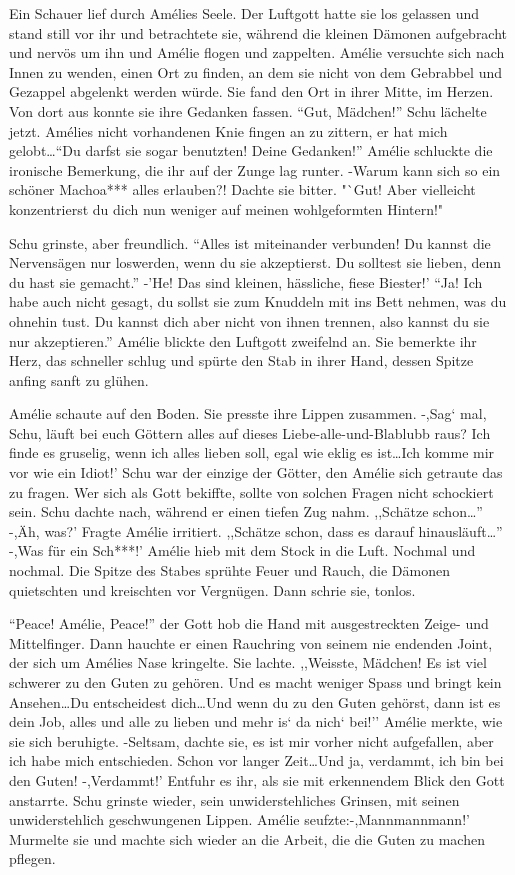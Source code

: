 \documentclass[11pt,titlepage,a5paper]{book}
\begin{document}
Ein Schauer lief durch Amélies Seele. Der Luftgott hatte sie los gelassen und stand still vor ihr und betrachtete sie, während die kleinen Dämonen aufgebracht und nervös um ihn und Amélie flogen und zappelten. Amélie versuchte sich nach Innen zu wenden, einen Ort zu finden, an dem sie nicht von dem Gebrabbel und Gezappel abgelenkt werden würde. Sie fand den Ort in ihrer Mitte, im Herzen. Von dort aus konnte sie ihre Gedanken fassen. "`Gut, Mädchen!"' Schu lächelte jetzt. Amélies nicht vorhandenen Knie fingen an zu zittern, er hat mich gelobt\dots "`Du darfst sie sogar benutzten! Deine Gedanken!"' Amélie schluckte die ironische Bemerkung, die ihr auf der Zunge lag runter. -Warum kann sich so ein schöner Machoa*** alles erlauben?! Dachte sie bitter. "`Gut! Aber vielleicht konzentrierst du dich nun weniger auf meinen wohlgeformten Hintern!" 

Schu grinste, aber freundlich. "`Alles ist miteinander verbunden! Du kannst die Nervensägen nur loswerden, wenn du sie akzeptierst. Du solltest sie lieben, denn du hast sie gemacht."' -'He! Das sind kleinen, hässliche, fiese Biester!' "`Ja! Ich habe auch nicht gesagt, du sollst sie zum Knuddeln mit ins Bett nehmen, was du ohnehin tust. Du kannst dich aber nicht von ihnen trennen, also kannst du sie nur akzeptieren."' Amélie blickte den Luftgott zweifelnd an. Sie bemerkte ihr Herz, das schneller schlug und spürte den Stab in ihrer Hand, dessen Spitze anfing sanft zu glühen.

Amélie schaute auf den Boden. Sie presste ihre Lippen zusammen. -,Sag` mal, Schu, läuft bei euch Göttern alles auf dieses Liebe-alle-und-Blablubb raus? Ich finde es gruselig, wenn ich alles lieben soll, egal wie eklig es ist\dots Ich komme mir vor wie ein Idiot!' Schu war der einzige der Götter, den Amélie sich getraute das zu fragen. Wer sich als Gott bekiffte, sollte von solchen Fragen nicht schockiert sein. Schu dachte nach, während er einen tiefen Zug nahm. ,,Schätze schon\dots'' -,Äh, was?' Fragte Amélie irritiert. ,,Schätze schon, dass es darauf hinausläuft\dots'' -,Was für ein Sch***!' Amélie hieb mit dem Stock in die Luft. Nochmal und nochmal. Die Spitze des Stabes sprühte Feuer und Rauch, die Dämonen quietschten und kreischten vor Vergnügen. Dann schrie sie, tonlos.

"`Peace! Amélie, Peace!"' der Gott hob die Hand mit ausgestreckten Zeige- und Mittelfinger. Dann hauchte er einen Rauchring von seinem nie endenden Joint, der sich um Amélies Nase kringelte. Sie lachte. ,,Weisste, Mädchen! Es ist viel schwerer zu den Guten zu gehören. Und es macht weniger Spass und bringt kein Ansehen\dots Du entscheidest dich\dots Und wenn du zu den Guten gehörst, dann ist es dein Job, alles und alle zu lieben und mehr is` da nich` bei!'' Amélie merkte, wie sie sich beruhigte. -Seltsam, dachte sie, es ist mir vorher nicht aufgefallen, aber ich habe mich entschieden. Schon vor langer Zeit\dots Und ja, verdammt, ich bin bei den Guten! -,Verdammt!' Entfuhr es ihr, als sie mit erkennendem Blick den Gott anstarrte. Schu grinste wieder, sein unwiderstehliches Grinsen, mit seinen unwiderstehlich geschwungenen Lippen. Amélie seufzte:-,Mannmannmann!' Murmelte sie und machte sich wieder an die Arbeit, die die Guten zu machen pflegen.
\end{document}
